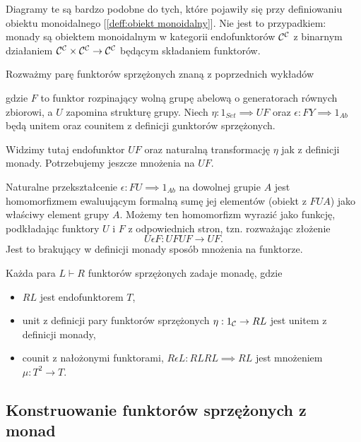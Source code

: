 Diagramy te są bardzo podobne do tych, które pojawiły się przy definiowaniu obiektu monoidalnego [\ref{deff:obiekt monoidalny}]. Nie jest to przypadkiem: monady są obiektem monoidalnym w kategorii endofunktorów $\mathcal{C}^{\mathcal{C}}$ z binarnym działaniem $\mathcal{C}^{\mathcal{C}}\times\mathcal{C}^{\mathcal{C}}\to \mathcal{C}^{\mathcal{C}}$ będącym składaniem funktorów.

\begin{example}
  Rozważmy parę funktorów sprzężonych znaną z poprzednich wykładów
  \begin{center}
  \end{center}
  gdzie $F$ to funktor rozpinający wolną grupę abelową o generatorach równych zbiorowi, a $U$ zapomina strukturę grupy. Niech $\eta:1_{Set}\implies UF$ oraz $\epsilon:FY\implies 1_{Ab}$ będą unitem oraz counitem z definicji gunktorów sprzężonych.

  Widzimy tutaj endofunktor $UF$ oraz naturalną transformację $\eta$ jak z definicji monady. Potrzebujemy jeszcze mnożenia na $UF$.

  Naturalne przekształcenie $\epsilon:FU\implies 1_{Ab}$ na dowolnej grupie $A$ jest homomorfizmem ewaluującym formalną sumę jej elementów (obiekt z $FUA$) jako właściwy element grupy $A$. Możemy ten homomorfizm wyrazić jako funkcję, podkładając funktory $U$ i $F$ z odpowiednich stron, tzn. rozważając złożenie
  $$U\epsilon F:UFUF\to UF.$$
  Jest to brakujący w definicji monady sposób mnożenia na funktorze.
\end{example}

\begin{lemma}{}{}
  Każda para $L\vdash R$ funktorów sprzężonych zadaje monadę, gdzie
  \begin{itemize}
    \item $RL$ jest endofunktorem $T$,
    \item unit z definicji pary funktorów sprzężonych $\eta:1_{\mathcal{C}}\to RL$ jest unitem z definicji monady,
    \item counit z nałożonymi funktorami, $R\epsilon L:RLRL\implies RL$ jest mnożeniem $\mu:T^2\to T$.
  \end{itemize}
\end{lemma}

\subsection{Konstruowanie funktorów sprzężonych z monad}

